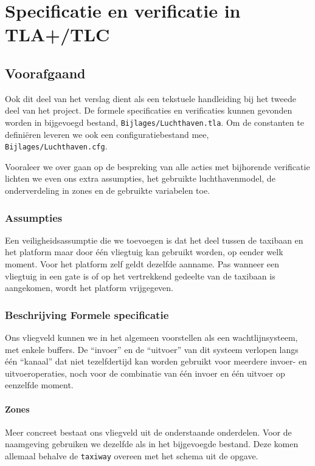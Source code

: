 \chapter{Specificatie en verificatie in TLA+/TLC}
\section{Voorafgaand}
Ook dit deel van het verslag dient als een tekstuele handleiding bij het tweede deel van het project. De formele specificaties en verificaties kunnen gevonden worden in bijgevoegd bestand,  \texttt{Bijlages/Luchthaven.tla}. Om de constanten te definiëren leveren we ook een configuratiebestand mee, \texttt{Bijlages/Luchthaven.cfg}.

Vooraleer we over gaan op de bespreking van alle acties met bijhorende verificatie lichten we even ons extra assumpties, het gebruikte luchthavenmodel, de onderverdeling in zones en de gebruikte variabelen toe.

\subsection{Assumpties}
Een veiligheidsassumptie die we toevoegen is dat het deel tussen de taxibaan en het platform maar door één vliegtuig kan gebruikt worden, op eender welk moment. Voor het platform zelf geldt dezelfde aanname. Pas wanneer een vliegtuig in een gate is of op het vertrekkend gedeelte van de taxibaan is aangekomen, wordt het platform vrijgegeven.

\subsection{Beschrijving Formele specificatie}
Ons vliegveld kunnen we in het algemeen voorstellen als een wachtlijnsysteem, met enkele buffers. De ``invoer'' en de ``uitvoer'' van dit systeem verlopen langs één ``kanaal'' dat niet tezelfdertijd kan worden gebruikt voor meerdere invoer- en uitvoeroperaties, noch voor de combinatie van één invoer en één uitvoer op eenzelfde moment.

\subsubsection{Zones}
Meer concreet bestaat ons vliegveld uit de onderstaande onderdelen. Voor de naamgeving gebruiken we dezelfde als in het bijgevoegde bestand. Deze komen allemaal behalve de \texttt{taxiway} overeen met het schema uit de opgave.  

